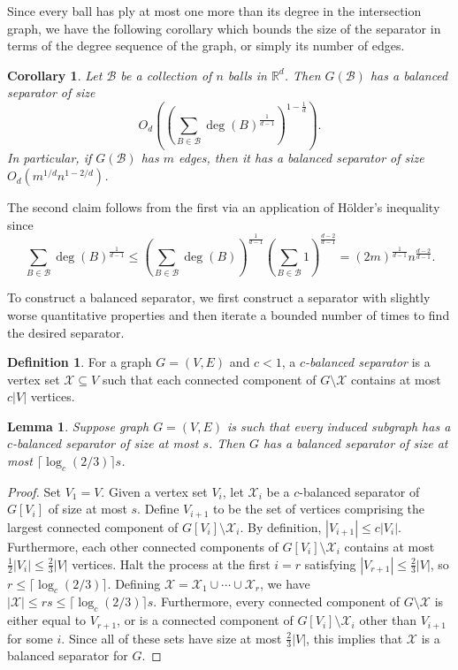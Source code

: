 \documentclass[11pt, reqno]{amsart}
\theoremstyle{plain}
\newtheorem{lemma}[theorem]{Lemma}
\newtheorem{corollary}[theorem]{Corollary}
\theoremstyle{definition}
\newtheorem{definition}[theorem]{Definition}
\theoremstyle{remark}
\numberwithin{theorem}{section}
\numberwithin{equation}{section}
\newcommand{\paren}[1]{\left( #1 \right)}
\newcommand{\R}{\mathbb R}
\newcommand{\fB}{\mathcal B}
\newcommand{\fX}{\mathcal X}
\begin{document}
Since every ball has ply at most one more than its degree in the intersection graph, we have the following corollary which bounds the size of the separator in terms of the degree sequence of the graph, or simply its number of edges.

\begin{corollary}
\label{cor:ball-separator-edge}
Let $\fB$ be a collection of $n$ balls in $\R^d$. Then $G(\fB)$ has a balanced separator of size
\[O_d\paren{\paren{\sum_{B\in\fB}\deg(B)^{\tfrac1{d-1}}}^{1-\tfrac1d}}.\]
In particular, if $G(\fB)$ has $m$ edges, then it has a balanced separator of size $O_d(m^{1/d}n^{1-2/d})$.
\end{corollary}

The second claim follows from the first via an application of H\"older's inequality since
\[\sum_{B\in\fB}\deg(B)^{\tfrac1{d-1}}\leq\paren{\sum_{B\in\fB}\deg(B)}^{\tfrac1{d-1}}\paren{\sum_{B\in\fB}1}^{\tfrac{d-2}{d-1}}=(2m)^{\tfrac1{d-1}}n^{\tfrac{d-2}{d-1}}.\]

To construct a balanced separator, we first construct a separator with slightly worse quantitative properties and then iterate a bounded number of times to find the desired separator.

\begin{definition}
For a graph $G=(V,E)$ and $c<1$, a \emph{$c$-balanced separator} is a vertex set $\fX\subseteq V$ such that each connected component of $G\setminus \fX$ contains at most $c|V|$ vertices. 
\end{definition}

\begin{lemma}
\label{lem:balancing-separators}
Suppose graph $G=(V,E)$ is such that every induced subgraph has a $c$-balanced separator of size at most $s$. Then $G$ has a balanced separator of size at most $\lceil \log_c(2/3)\rceil s$.
\end{lemma}

\begin{proof}
Set $V_1=V$. Given a vertex set $V_i$, let $\fX_i$ be a $c$-balanced separator of $G[V_i]$ of size at most $s$. Define $V_{i+1}$ to be the set of vertices comprising the largest connected component of $G[V_i]\setminus\fX_i$. By definition, $|V_{i+1}|\leq c|V_i|$. Furthermore, each other connected components of $G[V_i]\setminus\fX_i$ contains at most $\tfrac 12|V_i|\leq\tfrac23|V|$ vertices. Halt the process at the first $i=r$ satisfying $|V_{r+1}|\leq\tfrac23|V|$, so $r \leq \lceil \log_c(2/3)\rceil$. Defining $\fX=\fX_1\cup\cdots\cup\fX_r$, we have $|\fX|\leq rs\leq \lceil \log_c(2/3)\rceil s$. Furthermore, every connected component of $G\setminus\fX$ is either equal to $V_{r+1}$, or is a connected component of $G[V_i]\setminus\fX_i$ other than $V_{i+1}$ for some $i$. Since all of these sets have size at most $\tfrac23|V|$, this implies that $\fX$ is a balanced separator for $G$.
\end{proof}
\end{document}
